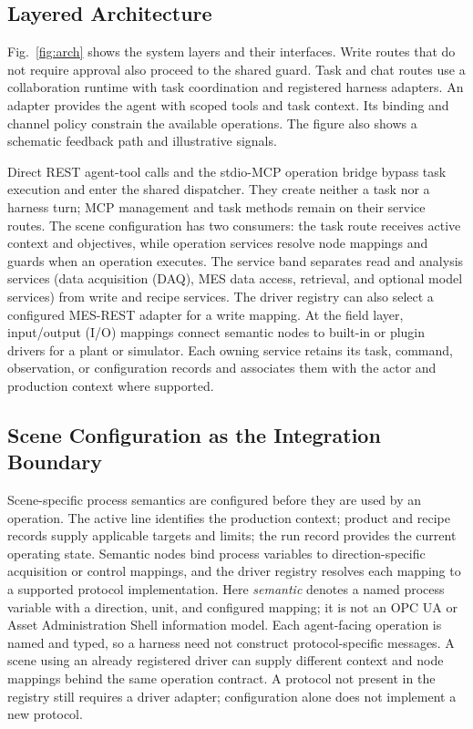 \subsection{Layered Architecture}
\label{sec:layers}
Fig.~\ref{fig:arch} shows the system layers and their interfaces. Write routes
that do not require approval also proceed to the shared guard. Task and chat
routes use a collaboration runtime with task coordination and registered
harness adapters. An adapter provides the agent with scoped tools and task context.
Its binding and channel policy constrain the available operations. The figure
also shows a schematic feedback path and illustrative signals.

Direct REST agent-tool calls and the stdio-MCP operation bridge bypass task execution
and enter the shared dispatcher. They create neither a task nor a harness
turn; MCP management and task methods remain on their service routes. The
scene configuration has two consumers: the task route receives active context
and objectives, while operation services resolve node mappings and guards
when an operation executes. The service band separates read and analysis services (data acquisition (DAQ), MES data access,
retrieval, and optional model services) from write and recipe services. The driver registry can also select a configured MES-REST adapter
for a write mapping. At the field layer, input/output (I/O) mappings connect
semantic nodes to built-in or plugin drivers for a plant or simulator. Each
owning service retains its task, command, observation, or configuration
records and associates them with the actor and production context where
supported.

\subsection{Scene Configuration as the Integration Boundary}
\label{sec:scene-config}
Scene-specific process semantics are configured before
they are used by an operation. The active line identifies the production context; product
and recipe records supply applicable targets and limits; the run record
provides the current operating state. Semantic nodes bind process variables
to direction-specific acquisition or control mappings, and the driver
registry resolves each mapping to a supported protocol implementation. Here
\emph{semantic} denotes a named process variable with a direction, unit, and
configured mapping; it is not an OPC UA or Asset Administration Shell
information model. Each agent-facing operation is named and typed, so a harness need not
construct protocol-specific messages. A scene using an already registered
driver can supply different context and node mappings behind the same
operation contract. A protocol not present in the registry still requires a
driver adapter; configuration alone does not implement a new protocol.

